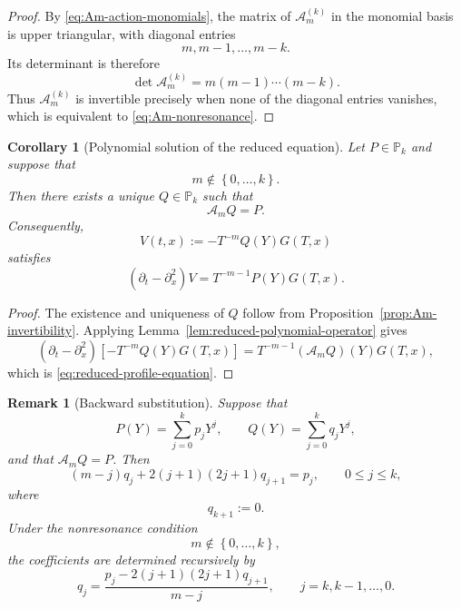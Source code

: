 \documentclass[11pt]{amsart}
\newtheorem{Corollary}{Corollary}[section]
\newtheorem{remark}{Remark}[section]
\theoremstyle{definition}
\theoremstyle{remark}
\numberwithin{equation}{section}
\newcommand{\set}[1]{\left\{#1\right\}}
\begin{document}
\begin{proof}
By \eqref{eq:Am-action-monomials}, the matrix of
$\mathcal A_m^{(k)}$ in the monomial basis is upper triangular, with
diagonal entries
\[
m,m-1,\ldots,m-k.
\]
Its determinant is therefore
\[
\det\mathcal A_m^{(k)}
=
m(m-1)\cdots(m-k).
\]
Thus $\mathcal A_m^{(k)}$ is invertible precisely when none of the
diagonal entries vanishes, which is equivalent to
\eqref{eq:Am-nonresonance}.
\end{proof}

\begin{Corollary}[Polynomial solution of the reduced equation]
\label{cor:reduced-polynomial-equation}
Let $P\in\mathbb P_k$ and suppose that
\[
m\notin\set{0,\ldots,k}.
\]
Then there exists a unique $Q\in\mathbb P_k$ such that
\begin{equation}\label{eq:reduced-polynomial-equation}
\mathcal A_mQ=P.
\end{equation}
Consequently,
\[
V(t,x)
:=
-T^{-m}Q(Y)G(T,x)
\]
satisfies
\begin{equation}\label{eq:reduced-profile-equation}
(\partial_t-\partial_x^2)V
=
T^{-m-1}P(Y)G(T,x).
\end{equation}
\end{Corollary}

\begin{proof}
The existence and uniqueness of $Q$ follow from
Proposition~\ref{prop:Am-invertibility}. Applying
Lemma~\ref{lem:reduced-polynomial-operator} gives
\[
(\partial_t-\partial_x^2)
\left[
-T^{-m}Q(Y)G(T,x)
\right]
=
T^{-m-1}(\mathcal A_mQ)(Y)G(T,x),
\]
which is \eqref{eq:reduced-profile-equation}.
\end{proof}

\begin{remark}[Backward substitution]
\label{rem:Am-backward-substitution}
Suppose that
\[
P(Y)=\sum_{j=0}^kp_jY^j,
\qquad
Q(Y)=\sum_{j=0}^kq_jY^j,
\]
and that $\mathcal A_mQ=P$. Then
\begin{equation}\label{eq:Am-coefficient-system}
(m-j)q_j
+
2(j+1)(2j+1)q_{j+1}
=
p_j,
\qquad
0\le j\le k,
\end{equation}
where
\[
q_{k+1}:=0.
\]
Under the nonresonance condition
\[
m\notin\set{0,\ldots,k},
\]
the coefficients are determined recursively by
\begin{equation}\label{eq:Am-backward-recursion}
q_j
=
\frac{
p_j-2(j+1)(2j+1)q_{j+1}
}{
m-j
},
\qquad
j=k,k-1,\ldots,0.
\end{equation}
\end{remark}
\end{document}
